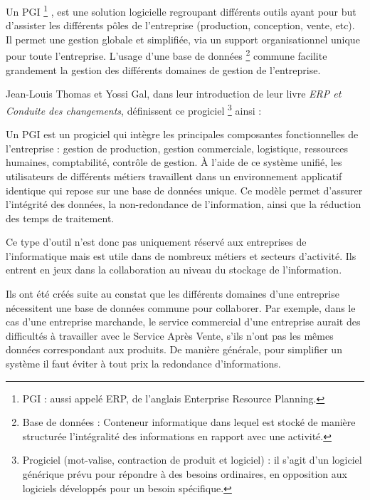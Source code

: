 Un \gls{PGI} \footnote{PGI : aussi appelé ERP, de l'anglais Enterprise Resource Planning.} , est une solution logicielle regroupant différents outils ayant pour but d'assister les différents pôles de l'entreprise (production, conception, vente, etc). Il permet une gestion globale et simplifiée, via un support organisationnel unique pour toute l'entreprise. L'usage d'une base de données \footnote{Base de données : Conteneur informatique dans lequel est stocké de manière structurée l'intégralité des informations en rapport avec une activité.} commune facilite grandement la gestion des différents domaines de gestion de l'entreprise.

Jean-Louis Thomas et Yossi Gal, dans leur introduction de leur livre \textit{ERP et Conduite des changements}, définissent ce progiciel \footnote{Progiciel (mot-valise, contraction de produit et logiciel) : il s'agit d'un logiciel  générique prévu pour répondre à des besoins ordinaires, en opposition aux logiciels développés pour un besoin spécifique.} ainsi :

\begin{Quote}
Un PGI est un progiciel qui intègre les principales composantes fonctionnelles de l'entreprise : gestion de production, gestion commerciale, logistique, ressources humaines, comptabilité, contrôle de gestion.
À l'aide de ce système unifié, les utilisateurs de différents métiers travaillent dans un environnement applicatif identique qui repose sur une base de données unique. Ce modèle permet d'assurer l'intégrité des données, la non-redondance de l'information, ainsi que la réduction des temps de traitement.
\end{Quote}


Ce type d'outil n'est donc pas uniquement réservé aux entreprises de l'informatique mais est utile dans de nombreux métiers et secteurs d'activité. Ils entrent en jeux dans la collaboration au niveau du stockage de l'information.

Ils ont été créés suite au constat que les différents domaines d'une entreprise nécessitent une base de données commune pour collaborer. Par exemple, dans le cas d'une entreprise marchande, le service commercial d'une entreprise aurait des difficultés à travailler avec le Service Après Vente, s'ils n'ont pas les mêmes données correspondant aux produits. De manière générale, pour simplifier un système il faut éviter à tout prix la redondance d'informations.\\


